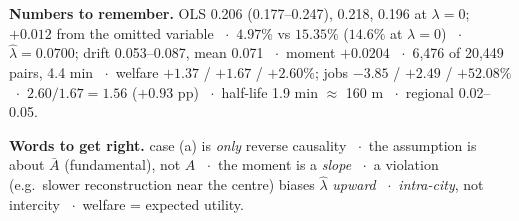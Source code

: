 \vspace{6pt}
\begin{tcolorbox}[colback=tint,colframe=tint,arc=0pt]
\small\textbf{Numbers to remember.} OLS 0.206 (0.177--0.247), 0.218, 0.196 at $\lambda=0$; $+0.012$ from the omitted variable \ $\cdot$\ $4.97\%$ vs $15.35\%$ ($14.6\%$ at $\lambda=0$) \ $\cdot$\ $\hat\lambda = 0.0700$; drift 0.053--0.087, mean 0.071 \ $\cdot$\ moment $+0.0204$ \ $\cdot$\ 6,476 of 20,449 pairs, 4.4 min \ $\cdot$\ welfare $+1.37$ / $+1.67$ / $+2.60\%$; jobs $-3.85$ / $+2.49$ / $+52.08\%$ \ $\cdot$\ $2.60/1.67 = 1.56$ ($+0.93$ pp) \ $\cdot$\ half-life 1.9 min $\approx$ 160 m \ $\cdot$\ regional 0.02--0.05.

\textbf{Words to get right.} case (a) is \emph{only} reverse causality \ $\cdot$\ the assumption is about $\bar A$ (fundamental), not $A$ \ $\cdot$\ the moment is a \emph{slope} \ $\cdot$\ a violation (e.g.\ slower reconstruction near the centre) biases $\hat\lambda$ \emph{upward} \ $\cdot$\ \emph{intra-city}, not intercity \ $\cdot$\ welfare = expected utility.
\end{tcolorbox}

